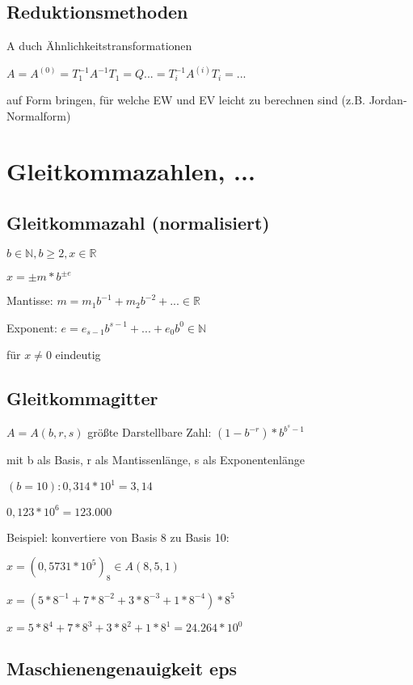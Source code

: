 \documentclass[12pt,a4paper]{article} %
\begin{document}
	\subsection{Reduktionsmethoden}
	
	A duch Ähnlichkeitstransformationen 
	
	$A = A^{(0)} = T_1^{-1} A^{-1}T_1 = Q ... = T_i^{-1}A^{(i)}T_i = ...$
	
	auf Form bringen, für welche EW und EV leicht zu berechnen sind (z.B. Jordan-Normalform)
	
	\newpage
	
	\section{Gleitkommazahlen, ...}
	
	\subsection{Gleitkommazahl (normalisiert)}
	
	$b \in \mathbb{N}, b \ge 2, x \in \mathbb{R}$
	
	$x = \pm m * b^{\pm e}$
	
	Mantisse: $m = m_1b^{-1} + m_2b^{-2} + ... \in \mathbb{R}$
	
	Exponent: $e = e_{s-1}b^{s-1} + ... + e_0b^0 \in \mathbb{N}$
	
	für $x \ne 0$ eindeutig
	
	\subsection{Gleitkommagitter}
	
	$A = A(b, r, s)$ größte Darstellbare Zahl: $(1 - b^{-r})*b^{b^s-1}$
	
	mit b als Basis, r als Mantissenlänge, s als Exponentenlänge
	
	$(b = 10): 0,314 * 10^1 = 3,14$
	
	$0,123 * 10^6 = 123.000$
	
	Beispiel: konvertiere von Basis 8 zu Basis 10:
	
	$x = (0,5731 * 10^5)_8 \in A(8, 5, 1)$
	
	$x = (5 * 8^{-1} + 7 * 8^{-2} + 3 * 8^{-3} + 1 * 8^{-4}) * 8^5$
	
	$x = 5 * 8^4 + 7 * 8^3 + 3 * 8^2 + 1 * 8^1 = 24.264 * 10^0$
	
	\subsection{Maschienengenauigkeit eps}
	
\end{document}

